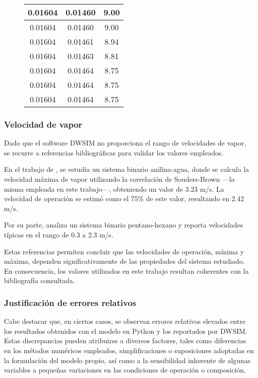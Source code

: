 \begin{figure}[H]
\begin{tabular}{|c|c|c|}
        \hline
        0.01604        & 0.01460         & 9.00                       \\
        \hline
        0.01604        & 0.01460         & 9.00                       \\
        \hline
        0.01604        & 0.01461         & 8.94                       \\
        \hline
        0.01604        & 0.01463         & 8.81                       \\
        \hline
        0.01604        & 0.01464         & 8.75                       \\
        \hline
        0.01604        & 0.01464         & 8.75                       \\
        \hline
        0.01604        & 0.01464         & 8.75                       \\
        \hline
    \end{tabular}
    \normalsize
\end{figure}

\newpage

\subsubsection{Velocidad de vapor}

Dado que el software DWSIM no proporciona el rango de velocidades de vapor, se recurre a referencias bibliográficas para validar los valores empleados.

En el trabajo de \textcite{GonzalezRamirez2020}, se estudia un sistema binario anilina-agua, donde se calcula la velocidad máxima de vapor utilizando la correlación de Souders-Brown —la misma empleada en este trabajo—, obteniendo un valor de 3.23 m/s. La velocidad de operación se estimó como el 75\% de este valor, resultando en 2.42 m/s.

Por su parte, \textcite{KLMTech2011} analiza un sistema binario pentano-hexano y reporta velocidades típicas en el rango de 0.3 a 2.3 m/s.

Estas referencias permiten concluir que las velocidades de operación, mínima y máxima, dependen significativamente de las propiedades del sistema estudiado. En consecuencia, los valores utilizados en este trabajo resultan coherentes con la bibliografía consultada.

\subsubsection{Justificación de errores relativos}
Cabe destacar que, en ciertos casos, se observan errores relativos elevados entre los resultados obtenidos con el modelo en Python y los reportados por DWSIM. Estas discrepancias pueden atribuirse a diversos factores, tales como diferencias en los métodos numéricos empleados, simplificaciones o suposiciones adoptadas en la formulación del modelo propio, así como a la sensibilidad inherente de algunas variables a pequeñas variaciones en las condiciones de operación o composición.
